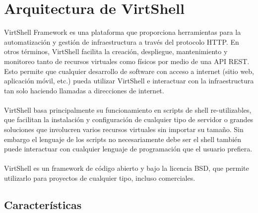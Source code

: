 \chapter{Arquitectura de VirtShell}
\label{Arquitectura}

VirtShell Framework es una plataforma que proporciona herramientas para la automatización y gestión de infraestructura a través del protocolo HTTP. En otros términos, VirtShell facilita la creación, despliegue, mantenimiento y monitoreo tanto de recursos virtuales como físicos por medio de una API REST. Esto permite que cualquier desarrollo de software con acceso a internet (sitio web, aplicación móvil, etc.) pueda utilizar VirtShell e interactuar con la infraestructura tan solo haciendo llamadas a direcciones de internet. \\
\\
VirtShell basa principalmente su funcionamiento en scripts de shell re-utilizables, que facilitan la instalación y configuración de cualquier tipo de servidor o grandes soluciones que involucren varios recursos virtuales sin importar su tamaño. Sin embargo el lenguaje de los scripts no necesariamente debe ser el shell también puede interactuar con cualquier lenguaje de programación que el usuario prefiera.\\
\\
VirtShell es un framework de código abierto y bajo la licencia BSD, que permite utilizarlo para proyectos de cualquier tipo, incluso comerciales. 

\section{Características}

